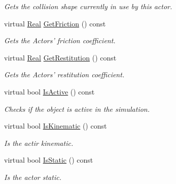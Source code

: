 \begin{DoxyCompactItemize}
\begin{DoxyCompactList}\small\item\em Gets the collision shape currently in use by this actor. \item\end{DoxyCompactList}\item 
virtual \hyperlink{namespaceMezzanine_a726731b1a7df72bf3583e4a97282c6f6}{Real} \hyperlink{classMezzanine_1_1ActorBasePhysicsSettings_ac59b0dfaf123ddfb3b70e35284502f56}{GetFriction} () const 
\begin{DoxyCompactList}\small\item\em Gets the Actors' friction coefficient. \item\end{DoxyCompactList}\item 
virtual \hyperlink{namespaceMezzanine_a726731b1a7df72bf3583e4a97282c6f6}{Real} \hyperlink{classMezzanine_1_1ActorBasePhysicsSettings_a4e648f892ff2b5a8d111ab312cec394b}{GetRestitution} () const 
\begin{DoxyCompactList}\small\item\em Gets the Actors' restitution coefficient. \item\end{DoxyCompactList}\item 
virtual bool \hyperlink{classMezzanine_1_1ActorBasePhysicsSettings_a8f81dffa07cc4c0f036443659b67bdef}{IsActive} () const 
\begin{DoxyCompactList}\small\item\em Checks if the object is active in the simulation. \item\end{DoxyCompactList}\item 
virtual bool \hyperlink{classMezzanine_1_1ActorBasePhysicsSettings_a23aafa40b7ee6e4f0da2120cd8f166bc}{IsKinematic} () const 
\begin{DoxyCompactList}\small\item\em Is the actir kinematic. \item\end{DoxyCompactList}\item 
virtual bool \hyperlink{classMezzanine_1_1ActorBasePhysicsSettings_a0639616581641cd6ec2b68f611d4e05a}{IsStatic} () const 
\begin{DoxyCompactList}\small\item\em Is the actor static. \item\end{DoxyCompactList}\item 

\end{DoxyCompactItemize}
